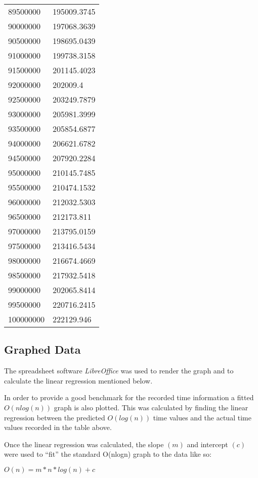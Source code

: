 \documentclass{article}
\begin{document}
\begin{longtable}[c]{ll}
89500000       & 195009.3745 \\
90000000       & 197068.3639 \\
90500000       & 198695.0439 \\
91000000       & 199738.3158 \\
91500000       & 201145.4023 \\
92000000       & 202009.4    \\
92500000       & 203249.7879 \\
93000000       & 205981.3999 \\
93500000       & 205854.6877 \\
94000000       & 206621.6782 \\
94500000       & 207920.2284 \\
95000000       & 210145.7485 \\
95500000       & 210474.1532 \\
96000000       & 212032.5303 \\
96500000       & 212173.811  \\
97000000       & 213795.0159 \\
97500000       & 213416.5434 \\
98000000       & 216674.4669 \\
98500000       & 217932.5418 \\
99000000       & 202065.8414 \\
99500000       & 220716.2415 \\
100000000      & 222129.946
\end{longtable}



\subsection{Graphed Data}
\noindent{}
The spreadsheet software \textit{LibreOffice} was used to render the graph and to calculate the linear regression mentioned below.

In order to provide a good benchmark for the recorded time information a fitted $O(nlog(n))$ graph is also plotted. This was calculated by finding the linear regression between the predicted $O(log(n))$ time values and the actual time values recorded in the table above.

Once the linear regression was calculated, the slope $(m)$ and intercept $(c)$ were used to ``fit'' the standard O(nlogn) graph to the data like so:
\begin{center}
  $O(n) = m * n * log(n) + c$
\end{center}
\end{document}

